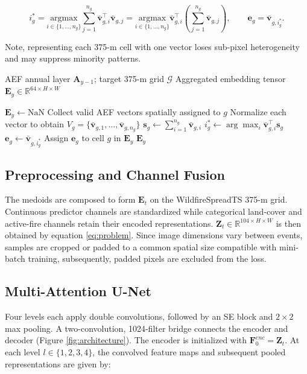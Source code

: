 \documentclass[sigconf]{acmart}
\begin{document}
\begin{equation}
 i_g^* = \underset{{i\in\{1,\ldots,n_g\}}}{\text{argmax}}
 \sum_{j=1}^{n_g}\bar{\mathbf{v}}_{g,i}^{\top}\bar{\mathbf{v}}_{g,j} = \underset{{i\in\{1,\ldots,n_g\}}}{\text{argmax}} 
 \bar{\mathbf{v}}_{g,i}^{\top} \left(\sum_{j=1}^{n_g}\bar{\mathbf{v}}_{g,j}\right), \qquad \mathbf{e}_g = \bar{\mathbf{v}}_{g,i_g^*}.
 \label{eq:medoid}
\end{equation}

Note, representing each 375-m cell with one vector loses sub-pixel heterogeneity and may suppress minority patterns.

\begin{algorithm}[ht!]
\caption{Cosine-Medoid Aggregation of AEF Embeddings}
\small
\begin{algorithmic}[1]
\Require AEF annual layer $\mathbf A_{y-1}$; target 375-m grid $\mathcal G$
\Ensure Aggregated embedding tensor $\mathbf E_y\in\mathbb R^{64\times H\times W}$

\State $\mathbf E_y \gets \text{NaN}$ 
    \State Collect valid AEF vectors spatially assigned to $g$
    \State Normalize each vector to obtain $V_g=
    \{\bar{\mathbf v}_{g,1},\ldots,\bar{\mathbf v}_{g,n_g}\}$
        \State $\mathbf s_g \gets\sum_{i=1}^{n_g}\bar{\mathbf v}_{g,i}$
        \State $i_g^*\gets\arg\max_i
        \bar{\mathbf v}_{g,i}^{\top}\mathbf s_g$
        \State $\mathbf e_g\gets\bar{\mathbf v}_{g,i_g^*}$
        \State Assign $\mathbf e_g$ to cell $g$ in $\mathbf E_y$
    \EndIf
\EndFor
\State \Return $\mathbf E_y$
\end{algorithmic}
\end{algorithm}

\subsection{Preprocessing and Channel Fusion}
The medoids are composed to form $\mathbf E_t$ on the WildfireSpreadTS 375-m grid. Continuous predictor channels are standardized while 
categorical land-cover and active-fire channels retain their encoded representations. $\mathbf Z_t\in\mathbb{R}^{104\times H\times W}$ is then 
obtained by equation \eqref{eq:problem}. Since image dimensions vary between events, samples are cropped or padded to a common spatial size 
compatible with mini-batch training, subsequently, padded pixels are excluded from the loss.

\subsection{Multi-Attention U-Net} 
Four levels each apply double convolutions, followed by an SE block and $2\times2$ max pooling. A two-convolution, 1024-filter bridge connects 
the encoder and decoder (Figure \ref{fig:architecture}). The encoder is initialized with $\mathbf{F}^{enc}_0=\mathbf{Z}_t$.
At each level $l\in\{1,2,3,4\}$, the convolved feature maps and subsequent pooled representations are given by:
\end{document}
